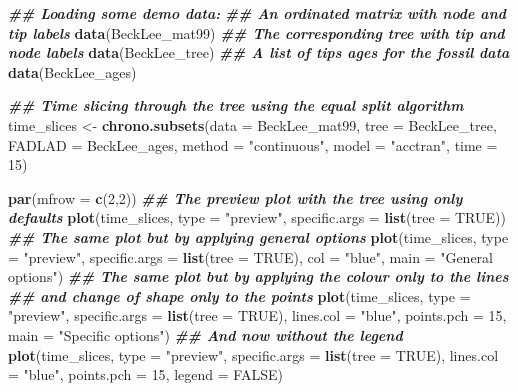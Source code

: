 \documentclass[
]{book}
\newenvironment{Shaded}{\begin{snugshade}}{\end{snugshade}}
\newcommand{\AttributeTok}[1]{\textcolor[rgb]{0.13,0.29,0.53}{#1}}
\newcommand{\ConstantTok}[1]{\textcolor[rgb]{0.56,0.35,0.01}{#1}}
\newcommand{\DecValTok}[1]{\textcolor[rgb]{0.00,0.00,0.81}{#1}}
\newcommand{\DocumentationTok}[1]{\textcolor[rgb]{0.56,0.35,0.01}{\textbf{\textit{#1}}}}
\newcommand{\FunctionTok}[1]{\textcolor[rgb]{0.13,0.29,0.53}{\textbf{#1}}}
\newcommand{\NormalTok}[1]{#1}
\newcommand{\OtherTok}[1]{\textcolor[rgb]{0.56,0.35,0.01}{#1}}
\newcommand{\StringTok}[1]{\textcolor[rgb]{0.31,0.60,0.02}{#1}}
\begin{document}
\begin{Shaded}
\begin{Highlighting}[]
\DocumentationTok{\#\# Loading some demo data:}
\DocumentationTok{\#\# An ordinated matrix with node and tip labels}
\FunctionTok{data}\NormalTok{(BeckLee\_mat99)}
\DocumentationTok{\#\# The corresponding tree with tip and node labels}
\FunctionTok{data}\NormalTok{(BeckLee\_tree)}
\DocumentationTok{\#\# A list of tips ages for the fossil data}
\FunctionTok{data}\NormalTok{(BeckLee\_ages)}

\DocumentationTok{\#\# Time slicing through the tree using the equal split algorithm}
\NormalTok{time\_slices }\OtherTok{\textless{}{-}} \FunctionTok{chrono.subsets}\NormalTok{(}\AttributeTok{data   =}\NormalTok{ BeckLee\_mat99,}
                              \AttributeTok{tree   =}\NormalTok{ BeckLee\_tree,}
                              \AttributeTok{FADLAD =}\NormalTok{ BeckLee\_ages,}
                              \AttributeTok{method =} \StringTok{"continuous"}\NormalTok{,}
                              \AttributeTok{model  =} \StringTok{"acctran"}\NormalTok{,}
                              \AttributeTok{time   =} \DecValTok{15}\NormalTok{)}

\FunctionTok{par}\NormalTok{(}\AttributeTok{mfrow =} \FunctionTok{c}\NormalTok{(}\DecValTok{2}\NormalTok{,}\DecValTok{2}\NormalTok{))}
\DocumentationTok{\#\# The preview plot with the tree using only defaults}
\FunctionTok{plot}\NormalTok{(time\_slices, }\AttributeTok{type =} \StringTok{"preview"}\NormalTok{, }\AttributeTok{specific.args =} \FunctionTok{list}\NormalTok{(}\AttributeTok{tree =} \ConstantTok{TRUE}\NormalTok{))}
\DocumentationTok{\#\# The same plot but by applying general options}
\FunctionTok{plot}\NormalTok{(time\_slices, }\AttributeTok{type =} \StringTok{"preview"}\NormalTok{, }\AttributeTok{specific.args =} \FunctionTok{list}\NormalTok{(}\AttributeTok{tree =} \ConstantTok{TRUE}\NormalTok{),}
     \AttributeTok{col =} \StringTok{"blue"}\NormalTok{, }\AttributeTok{main =} \StringTok{"General options"}\NormalTok{)}
\DocumentationTok{\#\# The same plot but by applying the colour only to the lines}
\DocumentationTok{\#\# and change of shape only to the points}
\FunctionTok{plot}\NormalTok{(time\_slices, }\AttributeTok{type =} \StringTok{"preview"}\NormalTok{, }\AttributeTok{specific.args =} \FunctionTok{list}\NormalTok{(}\AttributeTok{tree =} \ConstantTok{TRUE}\NormalTok{),}
     \AttributeTok{lines.col =} \StringTok{"blue"}\NormalTok{, }\AttributeTok{points.pch =} \DecValTok{15}\NormalTok{, }\AttributeTok{main =} \StringTok{"Specific options"}\NormalTok{)}
\DocumentationTok{\#\# And now without the legend}
\FunctionTok{plot}\NormalTok{(time\_slices, }\AttributeTok{type =} \StringTok{"preview"}\NormalTok{, }\AttributeTok{specific.args =} \FunctionTok{list}\NormalTok{(}\AttributeTok{tree =} \ConstantTok{TRUE}\NormalTok{),}
     \AttributeTok{lines.col =} \StringTok{"blue"}\NormalTok{, }\AttributeTok{points.pch =} \DecValTok{15}\NormalTok{, }\AttributeTok{legend =} \ConstantTok{FALSE}\NormalTok{)}
\end{Highlighting}
\end{Shaded}
\end{document}
